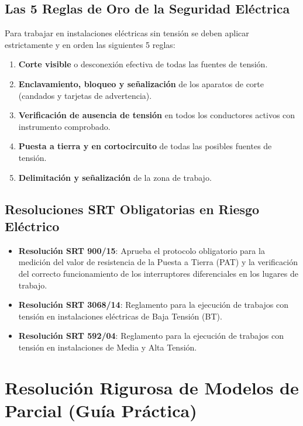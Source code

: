 \documentclass[]{informeutn}
\begin{document}
\section{Las 5 Reglas de Oro de la Seguridad Eléctrica}
Para trabajar en instalaciones eléctricas sin tensión se deben aplicar estrictamente y en orden las siguientes 5 reglas:

\begin{tcolorbox}[title=Las 5 Reglas de Oro (Procedimiento Obligatorio)]
\begin{enumerate}
    \item \textbf{Corte visible} o desconexión efectiva de todas las fuentes de tensión.
    \item \textbf{Enclavamiento, bloqueo y señalización} de los aparatos de corte (candados y tarjetas de advertencia).
    \item \textbf{Verificación de ausencia de tensión} en todos los conductores activos con instrumento comprobado.
    \item \textbf{Puesta a tierra y en cortocircuito} de todas las posibles fuentes de tensión.
    \item \textbf{Delimitación y señalización} de la zona de trabajo.
\end{enumerate}
\end{tcolorbox}

\section{Resoluciones SRT Obligatorias en Riesgo Eléctrico}
\begin{itemize}
    \item \textbf{Resolución SRT 900/15}: Aprueba el protocolo obligatorio para la medición del valor de resistencia de la Puesta a Tierra (PAT) y la verificación del correcto funcionamiento de los interruptores diferenciales en los lugares de trabajo.
    \item \textbf{Resolución SRT 3068/14}: Reglamento para la ejecución de trabajos con tensión en instalaciones eléctricas de Baja Tensión (BT).
    \item \textbf{Resolución SRT 592/04}: Reglamento para la ejecución de trabajos con tensión en instalaciones de Media y Alta Tensión.
\end{itemize}


\chapter{Resolución Rigurosa de Modelos de Parcial (Guía Práctica)}
\end{document}
